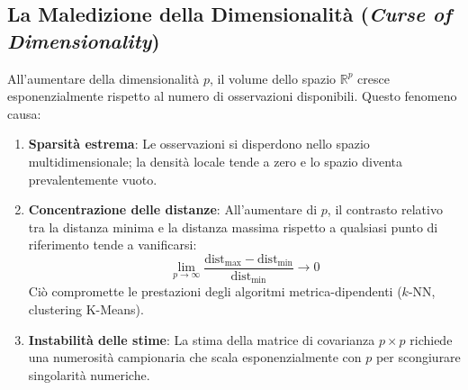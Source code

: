 \subsection{La Maledizione della Dimensionalità (\textit{Curse of Dimensionality})}

All'aumentare della dimensionalità $p$, il volume dello spazio $\mathbb{R}^p$ cresce esponenzialmente rispetto al numero di osservazioni disponibili. Questo fenomeno causa:
\begin{enumerate}
    \item \textbf{Sparsità estrema}: Le osservazioni si disperdono nello spazio multidimensionale; la densità locale tende a zero e lo spazio diventa prevalentemente vuoto.
    \item \textbf{Concentrazione delle distanze}: All'aumentare di $p$, il contrasto relativo tra la distanza minima e la distanza massima rispetto a qualsiasi punto di riferimento tende a vanificarsi:
    \begin{equation}
        \lim_{p \to \infty} \frac{\text{dist}_{\max} - \text{dist}_{\min}}{\text{dist}_{\min}} \to 0
    \end{equation}
    Ciò compromette le prestazioni degli algoritmi metrica-dipendenti ($k$-NN, clustering K-Means).
    \item \textbf{Instabilità delle stime}: La stima della matrice di covarianza $p \times p$ richiede una numerosità campionaria che scala esponenzialmente con $p$ per scongiurare singolarità numeriche.
\end{enumerate}

